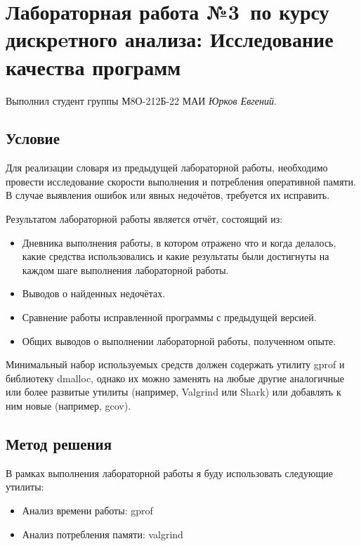 \documentclass[12pt]{article}
\begin{document}
\section*{Лабораторная работа №3\, по курсу дискрeтного анализа: Исследование качества программ}

Выполнил студент группы М8О-212Б-22 МАИ \textit{Юрков Евгений}.

\subsection*{Условие}


Для реализации словаря из предыдущей лабораторной работы, необходимо провести исследование скорости выполнения и потребления оперативной памяти.
В случае выявления ошибок или явных недочётов, требуется их исправить.

Результатом лабораторной работы является отчёт, состоящий из:

\begin{itemize}
    \item Дневника выполнения работы, в котором отражено что и когда делалось, какие средства использовались и какие результаты были достигнуты на каждом шаге выполнения
    лабораторной работы.
    \item Выводов о найденных недочётах.
    \item Сравнение работы исправленной программы с предыдущей версией.
    \item Общих выводов о выполнении лабораторной работы, полученном опыте.
\end{itemize}

Минимальный набор используемых средств должен содержать утилиту gprof и библиотеку dmalloc,
однако их можно заменять на любые другие аналогичные или более развитые утилиты (например, Valgrind или Shark)
или добавлять к ним новые (например, gcov).

\newpage
\subsection*{Метод решения}

В рамках выполнения лабораторной работы я буду использовать следующие утилиты:
\begin{itemize}
    \item Анализ времени работы: gprof
    \item Анализ потребления памяти: valgrind
\end{itemize}
\end{document}
